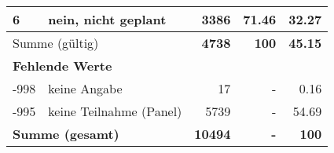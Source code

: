 \begin{longtable}{lXrrr}
     6 &
     \multicolumn{1}{X}{ nein, nicht geplant   } &


       \num{3386} &
       \num[round-mode=places,round-precision=2]{71,46} &
         \num[round-mode=places,round-precision=2]{32,27} \\
     \midrule
     \multicolumn{2}{l}{Summe (gültig)} &
       \textbf{\num{4738}} &
     \textbf{100} &
       \textbf{\num[round-mode=places,round-precision=2]{45,15}} \\
     \multicolumn{5}{l}{\textbf{Fehlende Werte}}\\
       -998 &
       keine Angabe &
         \num{17} &
        - &
         \num[round-mode=places,round-precision=2]{0,16} \\
       -995 &
       keine Teilnahme (Panel) &
         \num{5739} &
        - &
         \num[round-mode=places,round-precision=2]{54,69} \\
     \midrule
     \multicolumn{2}{l}{\textbf{Summe (gesamt)}} &
          \textbf{\num{10494}} &
        \textbf{-} &
        \textbf{100} \\
     \bottomrule
     \end{longtable}
     
